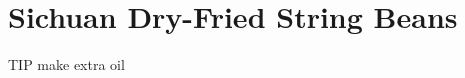 \chapter*{Sichuan Dry-Fried String Beans}
\renewcommand{\chaptertitle}{Sichuan Dry-Fried String Beans}

TIP make extra oil
